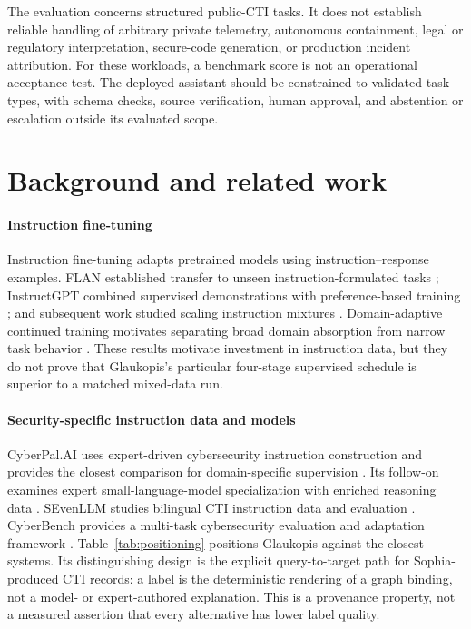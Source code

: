 \documentclass[preprint,12pt,authoryear]{elsarticle}
\begin{document}
The evaluation concerns structured public-CTI tasks. It does not establish reliable handling of arbitrary private telemetry, autonomous containment, legal or regulatory interpretation, secure-code generation, or production incident attribution. For these workloads, a benchmark score is not an operational acceptance test. The deployed assistant should be constrained to validated task types, with schema checks, source verification, human approval, and abstention or escalation outside its evaluated scope.

\section{Background and related work}\label{sec:related}
\paragraph{Instruction fine-tuning}
Instruction fine-tuning adapts pretrained models using instruction--response examples. FLAN established transfer to unseen instruction-formulated tasks \citep{wei2022flan}; InstructGPT combined supervised demonstrations with preference-based training \citep{ouyang2022instructgpt}; and subsequent work studied scaling instruction mixtures \citep{chung2024flant5}. Domain-adaptive continued training motivates separating broad domain absorption from narrow task behavior \citep{gururangan2020dontstop}. These results motivate investment in instruction data, but they do not prove that Glaukopis's particular four-stage supervised schedule is superior to a matched mixed-data run.

\paragraph{Security-specific instruction data and models}
CyberPal.AI uses expert-driven cybersecurity instruction construction and provides the closest comparison for domain-specific supervision \citep{levi2025cyberpal}. Its follow-on examines expert small-language-model specialization with enriched reasoning data \citep{levi2025toward}. SEvenLLM studies bilingual CTI instruction data and evaluation \citep{ji2024sevenllm}. CyberBench provides a multi-task cybersecurity evaluation and adaptation framework \citep{liu2024cyberbench}. Table~\ref{tab:positioning} positions Glaukopis against the closest systems. Its distinguishing design is the explicit query-to-target path for Sophia-produced CTI records: a label is the deterministic rendering of a graph binding, not a model- or expert-authored explanation. This is a provenance property, not a measured assertion that every alternative has lower label quality.
\end{document}
